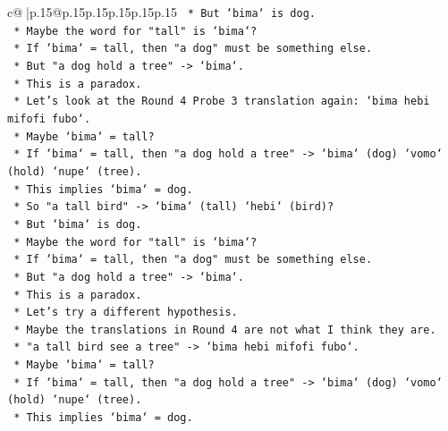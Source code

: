 \documentclass{article}
\begin{document}
{\begin{supertabular}{c@{$\;$}|p{.15\linewidth}@{}p{.15\linewidth}p{.15\linewidth}p{.15\linewidth}p{.15\linewidth}p{.15\linewidth}}
{{{\texttt{                            *   But `bima` is dog.} \\
\texttt{                            *   Maybe the word for "tall" is `bima`?} \\
\texttt{                            *   If `bima` = tall, then "a dog" must be something else.} \\
\texttt{                            *   But "a dog hold a tree" {-}> `bima`.} \\
\texttt{                            *   This is a paradox.} \\
\texttt{                            *   Let's look at the Round 4 Probe 3 translation again: `bima hebi mifofi fubo`.} \\
\texttt{                            *   Maybe `bima` = tall?} \\
\texttt{                            *   If `bima` = tall, then "a dog hold a tree" {-}> `bima` (dog) `vomo` (hold) `nupe` (tree).} \\
\texttt{                            *   This implies `bima` = dog.} \\
\texttt{                            *   So "a tall bird" {-}> `bima` (tall) `hebi` (bird)?} \\
\texttt{                            *   But `bima` is dog.} \\
\texttt{                            *   Maybe the word for "tall" is `bima`?} \\
\texttt{                            *   If `bima` = tall, then "a dog" must be something else.} \\
\texttt{                            *   But "a dog hold a tree" {-}> `bima`.} \\
\texttt{                            *   This is a paradox.} \\
\texttt{                            *   Let's try a different hypothesis.} \\
\texttt{                            *   Maybe the translations in Round 4 are not what I think they are.} \\
\texttt{                            *   "a tall bird see a tree" {-}> `bima hebi mifofi fubo`.} \\
\texttt{                            *   Maybe `bima` = tall?} \\
\texttt{                            *   If `bima` = tall, then "a dog hold a tree" {-}> `bima` (dog) `vomo` (hold) `nupe` (tree).} \\
\texttt{                            *   This implies `bima` = dog.} \\
}}}
\end{supertabular}}
\end{document}
